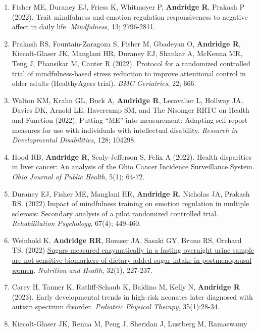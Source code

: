 \documentclass[
  english,
  letterpaper,
  DIV=11,
  numbers=noendperiod]{scrartcl}
\begin{document}
\begin{enumerate}
  health behaviors in people with Multiple Sclerosis (TRAC-MS): Study
  protocol and description of the study sample. \emph{Contemporary
  Clinical Trials Communications}, 30; 101006.
\item
  Fisher ME, Duraney EJ, Friess K, Whitmoyer P, \textbf{Andridge R},
  Prakash P (2022). Trait mindfulness and emotion regulation
  responsiveness to negative affect in daily life. \emph{Mindfulness},
  13; 2796-2811.
\item
  Prakash RS, Fountain-Zaragoza S, Fisher M, Gbadeyan O,
  \textbf{Andridge R}, Kiecolt-Glaser JK, Manglani HR, Duraney EJ,
  Shankar A, McKenna MR, Teng J, Phansikar M, Canter R (2022). Protocol
  for a randomized controlled trial of mindfulness-based stress
  reduction to improve attentional control in older adults (HealthyAgers
  trial). \emph{BMC Geriatrics}, 22; 666.
\item
  Walton KM, Krahn GL, Buck A, \textbf{Andridge R}, Lecavalier L,
  Hollway JA, Davies DK, Arnold LE, Havercamp SM, and The Nisonger RRTC
  on Health and Function (2022). Putting ``ME'' into measurement:
  Adapting self-report measures for use with individuals with
  intellectual disability. \emph{Research in Developmental
  Disabilities}, 128; 104298.
\item
  Hood RB, \textbf{Andridge R}, Sealy-Jefferson S, Felix A (2022).
  Health disparities in liver cancer: An analysis of the Ohio Cancer
  Incidence Surveillance System. \emph{Ohio Journal of Public Health},
  5(1); 64-72.
\item
  Duraney EJ, Fisher ME, Manglani HR, \textbf{Andridge R}, Nicholas JA,
  Prakash RS. (2022) Impact of mindfulness training on emotion
  regulation in multiple sclerosis: Secondary analysis of a pilot
  randomized controlled trial. \emph{Rehabilitation Psychology}, 67(4);
  449-460.
\item
  Weinhold K, \textbf{Andridge RR}, Bomser JA, Sasaki GY, Bruno RS,
  Orchard TS. (2022)
  \href{https://doi.org/10.1177/02601060221106819}{Sugars measured
  enzymatically in a fasting overnight urine sample are not sensitive
  biomarkers of dietary added sugar intake in postmenopausal women}.
  \emph{Nutrition and Health}, 32(1), 227-237.
\item
  Carey H, Tanner K, Ratliff-Schaub K, Baldino M, Kelly N,
  \textbf{Andridge R} (2023). Early developmental trends in high-risk
  neonates later diagnosed with autism spectrum disorder.
  \emph{Pediatric Physical Therapy}, 35(1):28-34.
\item
  Kiecolt-Glaser JK, Renna M, Peng J, Sheridan J, Lustberg M, Ramaswamy

\end{enumerate}
\end{document}
